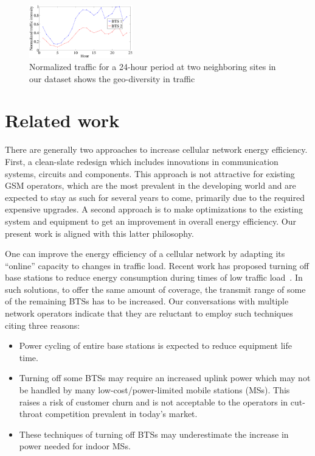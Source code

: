 \begin{figure}
\centering
{\includegraphics[width=0.4\textwidth]{pics/traffic.eps}
\caption{Normalized traffic for a 24-hour period at two neighboring sites in our dataset shows the geo-diversity in traffic}
\label{fig:traffic}
}
\end{figure}

\section{Related work}
\label{sec:case2:related}
There are generally two approaches to increase cellular network
energy efficiency. First, a clean-slate redesign which includes
innovations in communication systems, circuits and components.
This approach is not attractive for existing GSM operators,
which are the most prevalent in the developing world and are
expected to stay as such for several years to come, primarily due to the required expensive upgrades. A
second approach is to make optimizations to the existing system
and equipment to get an improvement in overall energy
efficiency. Our present work is aligned with this latter
philosophy.

One can improve the energy efficiency of a cellular network by
adapting its ``online'' capacity to changes in traffic load.
Recent work has proposed turning off base stations to reduce
energy consumption during times of low traffic
load~\cite{Louhi:2007:BTSPower:INTELEC,Oh:Comm:2011,Peng:2011:BTSSaving:Mobicom,He:CellularPower:JN:2012}.
In such solutions, to offer the same amount of coverage, the transmit range of some of the remaining BTSs has to be increased. Our conversations with multiple network operators
indicate that they are reluctant to employ such techniques
citing three reasons:
\begin{itemize}
\item Power cycling of entire base stations is expected to
    reduce equipment life time.
\item Turning off some BTSs may require an increased uplink
    power which may not be handled by many low-cost/power-limited mobile
    stations (MSs). This raises a risk of customer churn and is
    not acceptable to the operators in cut-throat
    competition prevalent in today's market.
\item These techniques of turning off BTSs may
    underestimate the increase in power needed for indoor
    MSs.
\end{itemize}

